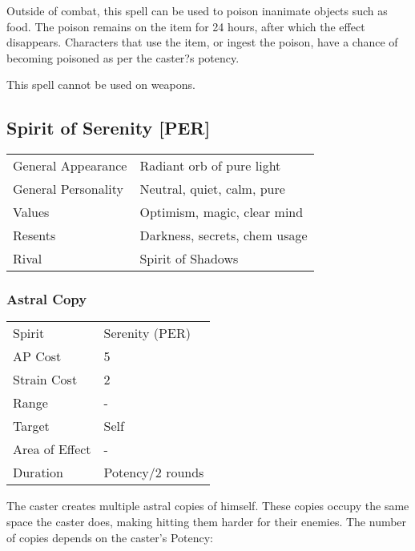 \documentclass[11pt,a4paper,twocolumn]{book}
\begin{document}
Outside of combat, this spell can be used to poison inanimate objects such as food. The poison remains on the item for 24 hours, after which the effect disappears. Characters that use the item, or ingest the poison, have a chance of becoming poisoned as per the caster?s potency.

This spell cannot be used on weapons.



\subsection*{Spirit of Serenity [PER]}
{
	\begin{tabu} to 75mm{| X[l,4] | X[l,8] |}
		\hline
		General Appearance  & Radiant orb of pure light     \\
		General Personality & Neutral, quiet, calm, pure    \\
		Values              & Optimism, magic, clear mind   \\
		Resents             & Darkness, secrets, chem usage \\
		Rival               & Spirit of Shadows             \\ \hline
	\end{tabu}
	
}
\medskip

\subsubsection*{Astral Copy}
{
	\begin{tabu} to 70mm{| X[l,4] | X[l,7] |}
		\hline
		Spirit         & Serenity (PER)        \\
		AP Cost        & 5                     \\
		Strain Cost    & 2                     \\
		Range          & -                     \\
		Target         & Self                  \\
		Area of Effect & -                     \\
		Duration       & Potency/2 rounds \\ \hline
	\end{tabu}
	
}
\medskip

The caster creates multiple astral copies of himself. These copies occupy the same space the caster does, making hitting them harder for their enemies. The number of copies depends on the caster's Potency:
\end{document}
